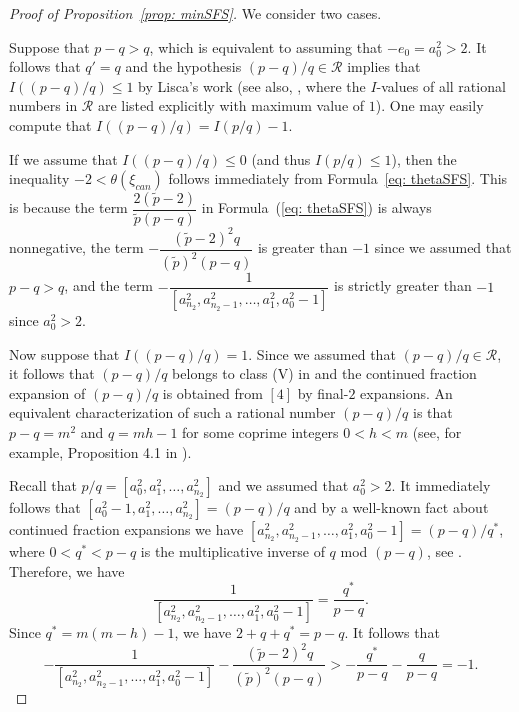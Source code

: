 \documentclass[11pt]{amsart}
\theoremstyle{plain}
\theoremstyle{definition}
\theoremstyle{remark}
\numberwithin{theorem}{section}
\begin{document}
\begin{proof}[Proof of Proposition~\ref{prop: minSFS}]
We consider two cases.

\smallskip
{} Suppose that $p-q >q$, which is equivalent to assuming that $-e_0=a_0^2 >2$.  It follows that $q'=q$ and  the hypothesis $(p-q)/q \in\mathcal{R}$ implies that $I((p-q)/q) \leq 1$ by Lisca's work \cite{Lisca2007} (see also, \cite[Appendix~A.2]{AcetoGollaLarsonLecuona2020pre}, where the $I$-values of all rational numbers in $\mathcal{R}$ are listed explicitly with maximum value of $1$). One may easily compute that $I((p-q)/q) = I(p/q) -1$. 

If we assume that $I((p-q)/q) \leq 0$ (and thus $I(p/q) \leq  1$), then the inequality  $-2 < \theta (\xi_{can})$ follows immediately from Formula~\eqref{eq: thetaSFS}. This is because the term $\dfrac{2(\widetilde{p}-2)}{\widetilde{p}(p-q)}$ in Formula~(\ref{eq: thetaSFS}) is always nonnegative, the term  $-\dfrac{(\widetilde{p}-2)^2 q}{(\widetilde{p})^2(p-q)}$ is greater than $-1$ since we assumed that $p-q >q$, and the term $-\dfrac{1}{[a^2_{n_2}, a^2_{n_2-1}, \ldots, a^2_1, a^2_0-1]}$ is strictly greater than $-1$ since $a^2_0 > 2$. 



Now suppose that $I((p-q)/q)=1$. Since we assumed that  $(p-q)/q \in\mathcal{R}$, it follows that $(p-q)/q$ belongs to class (V) in  \cite[Appendix~A.2]{AcetoGollaLarsonLecuona2020pre} and the continued fraction expansion of $(p-q)/q$ is obtained from $[4]$ by final-$2$ expansions. An equivalent characterization of such a rational number $(p-q)/q$  is that $p-q=m^2$ and $q=mh-1$  for some coprime integers $0< h < m$ (see, for example, Proposition 4.1 in  \cite{StipsiczSzaboWahl08}). 

Recall that $p/q=[a_0^2, a_1^2,\ldots, a_{n_2}^2]$ and we assumed that $a_0^2 >2$. It immediately follows that $[a_0^2-1, a_1^2,\ldots, a_{n_2}^2]=(p-q)/q$ and by a well-known fact about continued fraction expansions we have $[a^2_{n_2}, a^2_{n_2-1}, \ldots, a^2_1, a^2_0-1]=(p-q)/q^*$, where  $0 < q^* < p-q$ is the multiplicative inverse of $q$ mod $(p-q)$, see \cite[Lemma~A4]{OrlikWagreich77}. Therefore, we have 
\[
\dfrac{1}{[a^2_{n_2}, a^2_{n_2-1}, \ldots, a^2_1, a^2_0-1]}= \dfrac{q^*}{p-q}.
\]   Since $q^*=m(m-h)-1$, we have $2+q+q^*=p-q$. It follows that 
\[
-\dfrac{1}{[a^2_{n_2}, a^2_{n_2-1}, \ldots, a^2_1, a^2_0-1]}  -\dfrac{(\widetilde{p}-2)^2 q}{(\widetilde{p})^2(p-q)}
> -\dfrac{q^*}{p-q} -\dfrac{q}{p-q}= -1.
\]


\end{proof}
\end{document}
